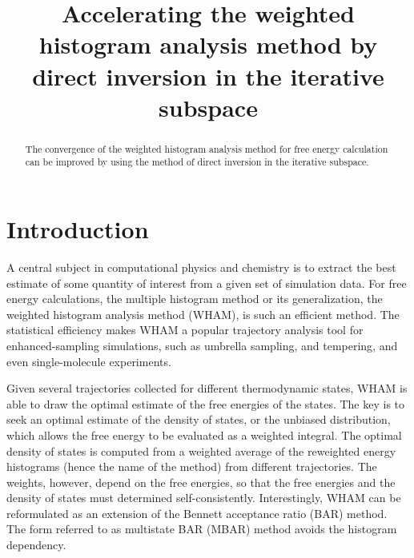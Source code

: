 \documentclass[reprint,aip,jcp,superscriptaddress]{revtex4-1}
\begin{document}
\newcommand{\vct}[1]{\mathbf{#1}}
\newcommand{\vx}{\vct{x}}
\newcommand{\vy}{\vct{y}}
\newcommand{\Z}{\mathcal{Z}}
\newcommand{\E}{\mathcal{E}}
\newcommand{\Ham}{\mathcal{H}}
\newcommand{\W}{\mathcal{W}}




\title{Accelerating the weighted histogram analysis method
by direct inversion in the iterative subspace}

\begin{abstract}
The convergence of the weighted histogram analysis method for free energy calculation
can be improved by using the method of direct inversion in the iterative subspace.
\end{abstract}

\maketitle




\section{Introduction}





A central subject in computational physics and chemistry
is to extract the best estimate of some quantity of interest
from a given set of simulation data.
%
For free energy calculations,
the multiple histogram method\cite{
ferrenberg1988, *ferrenberg1989,
newman, frenkel}
or its generalization,
the weighted histogram analysis method (WHAM)\cite{
kumar1992, roux1995,
bartels1997, *habeck2007, *habeck2012,
souaille2001,
chodera2007, shirts2008, bereau2009,
hub2010},
is such an efficient method.
%
The statistical efficiency
makes WHAM a popular trajectory analysis tool
for enhanced-sampling simulations,
such as umbrella sampling\cite{
torrie1974, *laio2002},
and tempering\cite{
marinari1992, *lyubartsev1992,
swendsen1986, *geyer1991, *hukushima1996, *hansmann1997, *earl2005},
and even single-molecule experiments\cite{
shirts2008}.




Given several trajectories collected
for different thermodynamic states,
WHAM is able to draw the optimal estimate
of the free energies of the states.
%
The key is to seek an optimal estimate
of the density of states,
or the unbiased distribution,
which allows
the free energy to be evaluated
as a weighted integral.
%
The optimal density of states
is computed from a weighted average
of the reweighted energy histograms
(hence the name of the method)
from different trajectories.
%
The weights, however,
depend on the free energies,
so that
the free energies
and the density of states
must determined self-consistently.
%
Interestingly,
WHAM can be reformulated
as an extension
of the Bennett acceptance ratio (BAR) method\cite{
bennett1976}.
%
The form referred to as multistate BAR (MBAR) method\cite{
shirts2008}
avoids the histogram dependency.
\end{document}
